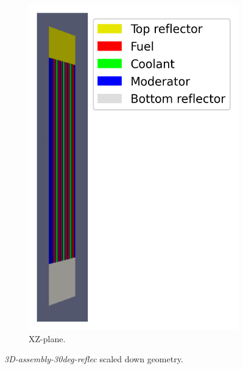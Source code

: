 \documentclass[11pt,letterpaper]{article}
\begin{document}
\begin{figure}[htbp!]
\begin{subfigure}[t]{0.4\textwidth}
			\includegraphics[width=\linewidth]{3D-assembly-mesh2}
			\caption{XZ-plane.}
		\end{subfigure}
		\hfill
		\caption{\textit{3D-assembly-30deg-reflec} scaled down geometry.}
		\label{fig:3D-assembly}
	\end{figure}
\end{document}
